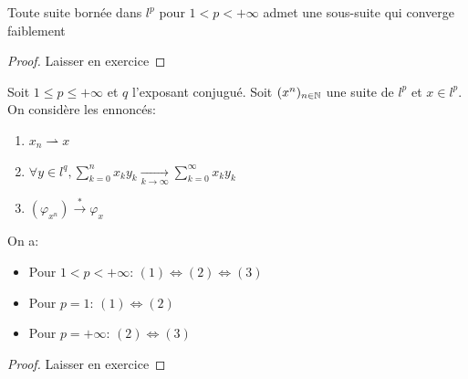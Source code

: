 \documentclass[]{report}
\begin{document}
    \begin{cor}{}{}
        Toute suite bornée dans $l^p$ pour $1<p<+\infty$ admet une sous-suite qui converge faiblement
    \end{cor}

    \begin{proof}
        Laisser en exercice
    \end{proof}

    \begin{cor}{}{}
        Soit $1\le p\le +\infty$ et $q$ l'exposant conjugué. Soit $(x^n)_{{n\in\mathbb{N}}}$ une suite de $l^p$ et $x\in l^p$. On considère les ennoncés:
        \begin{enumerate}
            \item $x_n \rightharpoonup x$
            \item $\forall y\in l^q, \sum_{k=0}^{n} x_k y_k \underset{k\to \infty}{\longrightarrow} \sum_{k=0}^{\infty} x_k y_k$
            \item $(\varphi_{x^n})\overset{*}{\longrightarrow} \varphi_x$
        \end{enumerate}
        On a:
        \begin{itemize}
            \item Pour $1<p<+\infty$: $(1)\iff (2)\iff (3)$
            \item Pour $p=1$: $(1)\iff (2)$
            \item Pour $p=+\infty$: $(2)\iff (3)$
        \end{itemize}
    \end{cor}

    \begin{proof}
        Laisser en exercice
    \end{proof}
\end{document}
